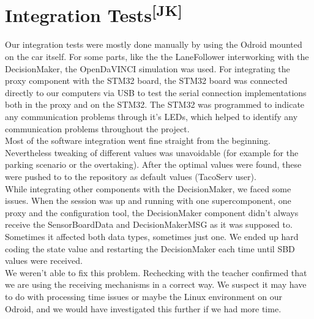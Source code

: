 \newpage
\section[Integration Tests]{Integration Tests\textsuperscript{[JK]}}
Our integration tests were mostly done manually by using the Odroid mounted on
the car itself. For some parts, like the the LaneFollower interworking with the
DecisionMaker, the OpenDaVINCI simulation was used. For integrating the proxy
component with the STM32 board, the STM32 board was connected directly to our
computers via USB to test the serial connection implementations both in the
proxy and on the STM32. The STM32 was programmed to indicate any communication
problems through it's LEDs, which helped to identify any communication problems
throughout the project.\\

\noindent
Most of the software integration went fine straight from the beginning.
Nevertheless tweaking of different values was unavoidable (for example for the
parking scenario or the overtaking). After the optimal values were found, these
were pushed to to the repository as default values (TacoServ user).\\

\noindent
While integrating other components with the DecisionMaker, we faced some issues.
When the session was up and running with one supercomponent, one proxy and the
configuration tool, the DecisionMaker component didn't always receive the
SensorBoardData and DecisionMakerMSG as it was supposed to. Sometimes it
affected both data types, sometimes just one. We ended up hard coding the state
value and restarting the DecisionMaker each time until SBD values were received.
\\
We weren't able to fix this problem. Rechecking with the teacher confirmed that
we are using the receiving mechanisms in a correct way. We suspect it may have
to do with processing time issues or maybe the Linux environment on our Odroid,
and we would have investigated this further if we had more time.
